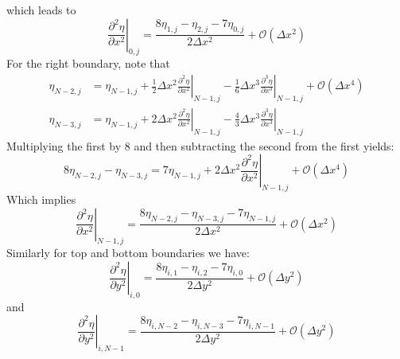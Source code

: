 \documentclass[reqno]{article}
\begin{document}
	which leads to
	\begin{equation}
		\left.\frac{\partial^2 \eta}{\partial x^2}\right|_{0, j} = \frac{8\eta_{1, j} - \eta_{2, j} - 7\eta_{0, j}}{2\Delta x^2} + \mathcal{O}\left( \Delta x^2 \right)
	\end{equation}
	For the right boundary, note that
	\begin{align}
		\eta_{N - 2, j} &= \eta_{N - 1, j} + \tfrac12 \Delta x^2 \left.\frac{\partial^2 \eta}{\partial x^2}\right|_{N - 1, j} - \tfrac16 \Delta x^3 \left.\frac{\partial^3 \eta}{\partial x^3}\right|_{N - 1, j} + \mathcal{O}\left(\Delta x^4\right) \\
		\eta_{N - 3, j} &= \eta_{N - 1, j} + 2\Delta x^2 \left. \frac{\partial^2 \eta}{\partial x^2}\right|_{N - 1, j} - \tfrac43 \Delta x^3 \left.\frac{\partial^3 \eta}{\partial x^3}\right|_{N - 1, j}
	\end{align}
	Multiplying the first by $8$ and then subtracting the second from the first yields:
	\begin{equation}
		8\eta_{N - 2, j} - \eta_{N - 3, j} = 7\eta_{N - 1, j} + 2 \Delta x^2 \left. \frac{\partial^2 \eta}{\partial x^2}\right|_{N - 1, j} + \mathcal{O} \left( \Delta x^4 \right)
	\end{equation}
	Which implies
	\begin{equation}
		\left.\frac{\partial^2 \eta}{\partial x^2}\right|_{N - 1, j} = \frac{8\eta_{N - 2, j} - \eta_{N - 3, j} - 7\eta_{N - 1, j}}{2\Delta x^2} + \mathcal{O}\left( \Delta x^2 \right)
	\end{equation}
	Similarly for top and bottom boundaries we have:
	\begin{equation}
		\left.\frac{\partial^2 \eta}{\partial y^2}\right|_{i, 0} = \frac{8\eta_{i, 1} - \eta_{i, 2} - 7\eta_{i, 0}}{2\Delta y^2} + \mathcal{O}\left( \Delta y^2 \right)
	\end{equation}
	and
	\begin{equation}
		\left.\frac{\partial^2 \eta}{\partial y^2}\right|_{i, N - 1} = \frac{8\eta_{i, N - 2} - \eta_{i, N - 3} - 7\eta_{i, N - 1}}{2\Delta y^2} + \mathcal{O} \left( \Delta y^2 \right)
	\end{equation}
	
\end{document}
